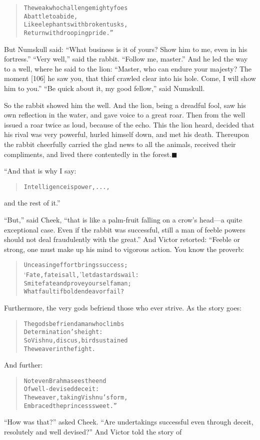 \documentclass[article, twoside, 14pt]{memoir}
\newcommand{\qed}{\hfill \ensuremath{\blacksquare}}
\renewenvironment{verbatim}{%
\begin{quote}%
\vskip -10pt%
\begin{alltt}\normalfont\large}{\end{alltt}%
\end{quote}%
\vskip -10pt
} %
\begin{document}
\begin{verbatim}
The weak who challenge mighty foes
    A battle to abide,
Like elephants with broken tusks,
    Return with drooping pride.”
\end{verbatim}
But Numskull said:
``What business is it of yours? Show him to me, even in his fortress.''
``Very well,'' said the rabbit. ``Follow me, master.'' And he led
the way to a well, where he said to the lion:
``Master, who can endure your majesty? The moment [106] he saw you, that thief crawled clear into his hole. Come, I will show him to you.''
``Be quick about it, my good fellow,'' said Numskull.

So the rabbit showed him the well. And the lion, being a dreadful
fool, saw his own reflection in the water, and gave voice to a
great roar. Then from the well issued a roar twice as loud, because
of the echo. This the lion heard, decided that his rival was very
powerful, hurled himself down, and met his death. Thereupon the
rabbit cheerfully carried the glad news to all the animals,
received their compliments, and lived there contentedly in the
forest.\hyperref[s10]{\qed}

“And that is why I say:

\begin{verbatim}
Intelligence is power, ...,
\end{verbatim}
and the rest of it.”

``But,'' said Cheek,
``that is like a palm-fruit falling on a crow's head---a quite exceptional case. Even if the rabbit was successful, still a man of feeble powers should not deal fraudulently with the great.''
And Victor retorted: “Feeble or strong, one must make up his mind
to vigorous action. You know the proverb:

\begin{verbatim}
Unceasing effort brings success;
    ‘Fate, fate is all,’ let dastards wail:
Smite fate and prove yourself a man;
    What fault if bold endeavor fail?
\end{verbatim}
Furthermore, the very gods befriend those who ever strive. As the
story goes:

\begin{verbatim}
The gods befriend a man who climbs
    Determination's height:
So Vishnu, discus, bird sustained
    The weaver in the fight.
\end{verbatim}
And further:

\begin{verbatim}
Not even Brahma sees the end
    Of well-devised deceit:
The weaver, taking Vishnu's form,
    Embraced the princess sweet.”
\end{verbatim}
``How was that?'' asked Cheek.
``Are undertakings successful even through deceit, resolutely and well devised?''
And Victor told the story of
\end{document}
